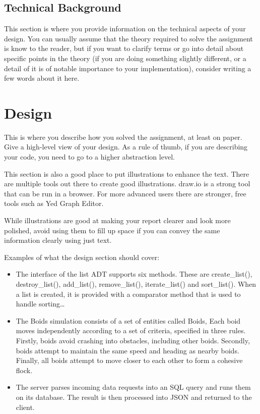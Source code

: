 \documentclass{article}
\begin{document}
\begin{flushleft}
\subsection{Technical Background}
This section is where you provide information on the technical aspects of your design. You can usually assume that the theory required to solve the assignment is know to the reader, but if you want to clarify terms or go into detail about specific points in the theory (if you are doing something slightly different, or a detail of it is of notable importance to your implementation), consider writing a few words about it here. 

\section{Design }
This is where you describe how you solved the assignment, at least on paper. Give a high-level view of your design. As a rule of thumb, if you are describing your code, you need to go to a higher abstraction level.


\bigskip

This section is also a good place to put illustrations to enhance the text. There are multiple tools out there to create good illustrations. draw.io is a strong tool that can be run in a browser. For more advanced users there are stronger, free tools such as Yed Graph Editor.


\bigskip

While illustrations are good at making your report clearer and look more polished, avoid using them to fill up space if you can convey the same information clearly using just text.


\bigskip

Examples of what the design section should cover:

\begin{itemize}
\item The interface of the list ADT supports six methods. These are create\_list(), destroy\_list(), add\_list(), remove\_list(), iterate\_list() and sort\_list(). When a list is created, it is provided with a comparator method that is used to handle sorting{\dots}
\item The Boids simulation consists of a set of entities called Boids, Each boid moves independently according to a set of criteria, specified in three rules. Firstly, boids avoid crashing into obstacles, including other boids. Secondly, boids attempt to maintain the same speed and heading as nearby boids. Finally, all boids attempt to move closer to each other to form a cohesive flock.
\item The server parses incoming data requests into an SQL query and runs them on its database. The result is then processed into JSON and returned to the client.
\end{itemize}


\end{flushleft}
\end{document}
